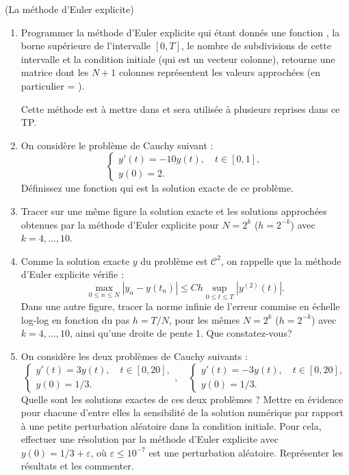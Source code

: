 \documentclass[a4paper,12pt,reqno]{amsart}
\begin{document}
\begin{exo} (La méthode d'Euler explicite)
  \begin{enumerate}\label{ex:euler}

    \item Programmer la méthode d'Euler explicite  qui étant donnés une fonction , la borne supérieure  de l'intervalle $[0,T]$, le nombre de subdivisions  de cette intervalle et la condition initiale  (qui est un vecteur colonne), retourne une matrice  dont les $N+1$ colonnes représentent les valeurs approchées (en particulier  = ).

    Cette méthode est à mettre dans  et sera utilisée à plusieurs reprises dans ce TP.

    \item On considère le problème de Cauchy suivant :
      $$
        \begin{cases}
          y'(t)=-10y(t), \quad t \in [0,1], \\
          y(0)=2.
        \end{cases}
      $$
    Définissez une fonction  qui est la solution exacte de ce problème.

    \item Tracer sur une même figure la solution exacte et les solutions approchées obtenues par la méthode d'Euler explicite pour $N=2^{k}$ ($h=2^{-k}$) avec $k=4,\dots,10$.

    \item\label{q:oceuler} Comme la solution exacte $y$ du problème est ${\mathcal{C}}^{2}$, on rappelle que la méthode d'Euler explicite vérifie :
    $$
      \max_{0 \leq n \leq N} |y_n-y(t_n)|\leq C h \sup_{0 \leq t \leq T} |y^{(2)}(t)|.
    $$
    Dans une autre figure, tracer la norme infinie de l'erreur commise en échelle \og{}log-log\fg{} en fonction du pas $h=T/N$, pour les mêmes $N=2^{k}$ ($h=2^{-k}$) avec $k=4,\dots,10$, ainsi qu'une droite de pente 1.
    Que constatez-vous?
    \item
    On considère les deux problèmes de Cauchy suivants :
    $$
      \begin{cases}
        y'(t)=3y(t), \quad t \in [0,20], \\
        y(0)=1/3.
      \end{cases}
      , \quad
      \begin{cases}
        y'(t)=-3y(t), \quad t \in [0,20], \\
        y(0)=1/3.
      \end{cases}
    $$
    Quelle sont les solutions exactes de ces deux problèmes ? Mettre en évidence  pour chacune d'entre elles la sensibilité de la solution numérique par rapport à une petite perturbation aléatoire dans la condition initiale. Pour cela, effectuer une résolution par la méthode d'Euler explicite avec $y(0)= 1/3 + \varepsilon$, où $\varepsilon \leq 10^{-7}$ est une perturbation aléatoire. Représenter les résultats et les commenter.
  \end{enumerate}
\end{exo}
\end{document}
